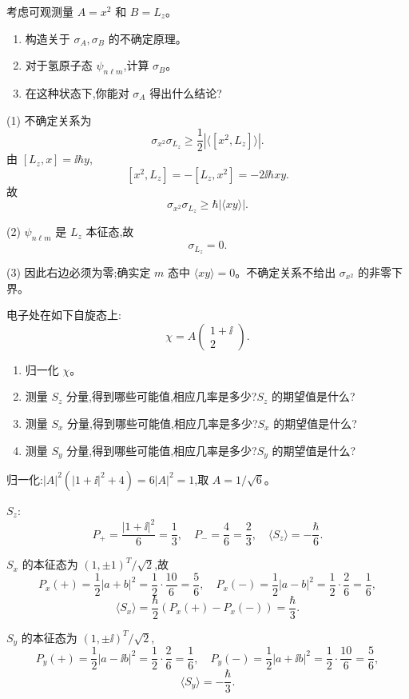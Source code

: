 \begin{question}
考虑可观测量 $A=x^2$ 和 $B=L_z$。
\begin{enumerate}
\item 构造关于 $\sigma_A,\sigma_B$ 的不确定原理。
\item 对于氢原子态 $\psi_{n\ell m}$,计算 $\sigma_B$。
\item 在这种状态下,你能对 $\sigma_A$ 得出什么结论?
\end{enumerate}
\begin{solution}

(1) 不确定关系为
\[
\sigma_{x^2}\sigma_{L_z}\ge\frac12|\langle[x^2,L_z]\rangle|.
\]
由 $[L_z,x]=\ii\hbar y$,
\[
[x^2,L_z]=-[L_z,x^2]=-2\ii\hbar xy.
\]
故
\[
\sigma_{x^2}\sigma_{L_z}\ge \hbar|\langle xy\rangle|.
\]

(2) $\psi_{n\ell m}$ 是 $L_z$ 本征态,故
\[
\sigma_{L_z}=0.
\]

(3) 因此右边必须为零;确实定 $m$ 态中 $\langle xy\rangle=0$。不确定关系不给出 $\sigma_{x^2}$ 的非零下界。

\end{solution}
\end{question}

\begin{question}
电子处在如下自旋态上:
\[
\chi=A\begin{pmatrix}1+\ii\\2\end{pmatrix}.
\]
\begin{enumerate}
\item 归一化 $\chi$。
\item 测量 $S_z$ 分量,得到哪些可能值,相应几率是多少?$S_z$ 的期望值是什么?
\item 测量 $S_x$ 分量,得到哪些可能值,相应几率是多少?$S_x$ 的期望值是什么?
\item 测量 $S_y$ 分量,得到哪些可能值,相应几率是多少?$S_y$ 的期望值是什么?
\end{enumerate}
\begin{solution}

归一化:$|A|^2(|1+
\ii|^2+4)=6|A|^2=1$,取 $A=1/\sqrt6$。

$S_z$:
\[
P_+=\frac{|1+\ii|^2}{6}=\frac13,
\quad P_-=\frac{4}{6}=\frac23,
\quad \langle S_z\rangle=-\frac\hbar6.
\]

$S_x$ 的本征态为 $(1,\pm1)^T/\sqrt2$,故
\[
P_x(+)=\frac12|a+b|^2=\frac12\cdot\frac{10}{6}=\frac56,
\quad P_x(-)=\frac12|a-b|^2=\frac12\cdot\frac{2}{6}=\frac16,
\]
\[
\langle S_x\rangle=\frac\hbar2(P_x(+)-P_x(-))=\frac\hbar3.
\]

$S_y$ 的本征态为 $(1,\pm\ii)^T/\sqrt2$,
\[
P_y(+)=\frac12|a-\ii b|^2=\frac12\cdot\frac{2}{6}=\frac16,
\quad P_y(-)=\frac12|a+\ii b|^2=\frac12\cdot\frac{10}{6}=\frac56,
\]
\[
\langle S_y\rangle=-\frac\hbar3.
\]

\end{solution}
\end{question}

